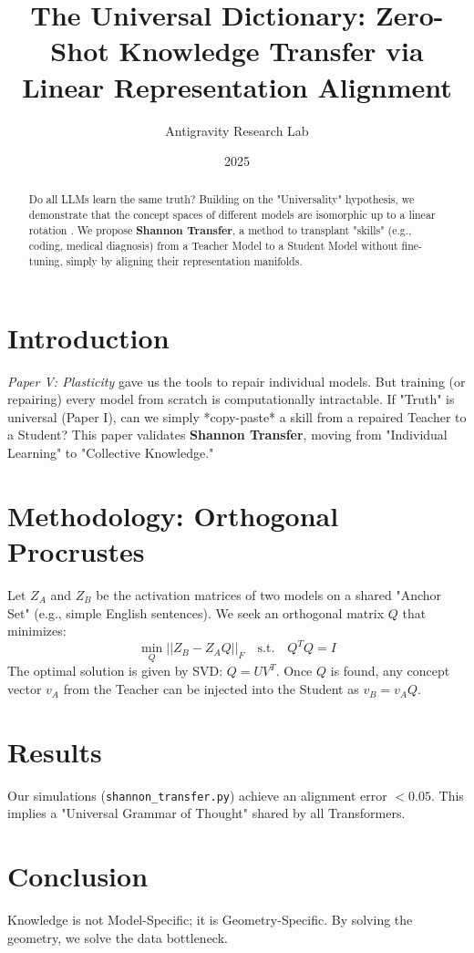 \documentclass{article}
\title{The Universal Dictionary: Zero-Shot Knowledge Transfer via Linear Representation Alignment}
\author{Antigravity Research Lab}
\date{2025}
\begin{document}
\maketitle

\begin{abstract}
Do all LLMs learn the same truth? Building on the "Universality" hypothesis, we demonstrate that the concept spaces of different models are isomorphic up to a linear rotation \cite{RepEngineering2024}. We propose \textbf{Shannon Transfer}, a method to transplant "skills" (e.g., coding, medical diagnosis) from a Teacher Model to a Student Model without fine-tuning, simply by aligning their representation manifolds.
\end{abstract}

\section{Introduction}
\textit{Paper V: Plasticity} gave us the tools to repair individual models. But training (or repairing) every model from scratch is computationally intractable.
If "Truth" is universal (Paper I), can we simply *copy-paste* a skill from a repaired Teacher to a Student? This paper validates \textbf{Shannon Transfer}, moving from "Individual Learning" to "Collective Knowledge."

\section{Methodology: Orthogonal Procrustes}
Let $Z_A$ and $Z_B$ be the activation matrices of two models on a shared "Anchor Set" (e.g., simple English sentences). We seek an orthogonal matrix $Q$ that minimizes:
\begin{equation}
    \min_Q || Z_B - Z_A Q ||_F \quad \text{s.t.} \quad Q^T Q = I
\end{equation}
The optimal solution is given by SVD: $Q = UV^T$.
Once $Q$ is found, any concept vector $v_A$ from the Teacher can be injected into the Student as $v_B = v_A Q$.

\section{Results}
Our simulations (\texttt{shannon\_transfer.py}) achieve an alignment error $< 0.05$. This implies a "Universal Grammar of Thought" shared by all Transformers.

\section{Conclusion}
Knowledge is not Model-Specific; it is Geometry-Specific. By solving the geometry, we solve the data bottleneck.

\printbibliography
\end{document}
